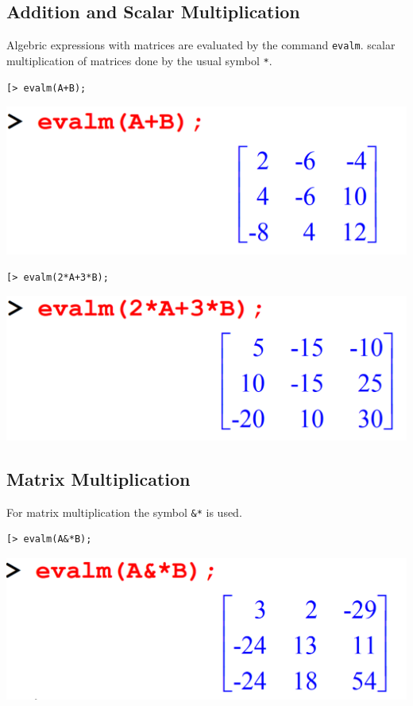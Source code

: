 \documentclass[
]{book}
\theoremstyle{definition}
\theoremstyle{definition}
\theoremstyle{definition}
\theoremstyle{definition}
\theoremstyle{remark}
\begin{document}
\subsection{Addition and Scalar Multiplication}\label{addition-and-scalar-multiplication}

Algebric expressions with matrices are evaluated by the command \texttt{evalm}. scalar multiplication of matrices done by the usual symbol \texttt{*}.

\begin{verbatim}
[> evalm(A+B);
\end{verbatim}

\includegraphics{figures/Lesson 4/fig24.png}

\begin{verbatim}
[> evalm(2*A+3*B);
\end{verbatim}

\includegraphics{figures/Lesson 4/fig25.png}

\subsection{Matrix Multiplication}\label{matrix-multiplication}

For matrix multiplication the symbol \texttt{\&*} is used.

\begin{verbatim}
[> evalm(A&*B);
\end{verbatim}

\includegraphics{figures/Lesson 4/fig26.png}
\end{document}
